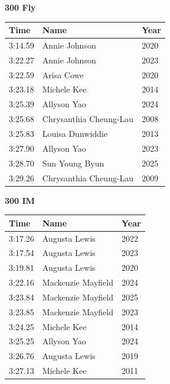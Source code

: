 \vspace{1.2em}
\noindent\begin{minipage}[t]{0.48\textwidth}
\centering
\textbf{\textcolor{teamprimary}{300 Fly}}\par
\vspace{0.5em}
\centering
\small
\renewcommand{\arraystretch}{1.0}
\setlength{\tabcolsep}{4pt}
\begin{tabular}{@{}p{1.8cm}p{3.0cm}p{1.0cm}@{}}
\toprule
\textbf{Time} & \textbf{Name} & \textbf{Year} \\
\midrule
3:14.59 & Annie Johnson & 2020 \\
3:22.27 & Annie Johnson & 2023 \\
3:22.59 & Arisa Cowe & 2020 \\
3:23.18 & Michele Kee & 2014 \\
3:25.39 & Allyson Yao & 2024 \\
3:25.68 & Chrysanthia Cheung-Lau & 2008 \\
3:25.83 & Louisa Dunwiddie & 2013 \\
3:27.90 & Allyson Yao & 2023 \\
3:28.70 & Sun Young Byun & 2025 \\
3:29.26 & Chrysanthia Cheung-Lau & 2009 \\
\bottomrule
\end{tabular}
\end{minipage}
\hfill
\begin{minipage}[t]{0.48\textwidth}
\centering
\textbf{\textcolor{teamprimary}{300 IM}}\par
\vspace{0.5em}
\centering
\small
\renewcommand{\arraystretch}{1.0}
\setlength{\tabcolsep}{4pt}
\begin{tabular}{@{}p{1.8cm}p{3.0cm}p{1.0cm}@{}}
\toprule
\textbf{Time} & \textbf{Name} & \textbf{Year} \\
\midrule
3:17.26 & Augusta Lewis & 2022 \\
3:17.54 & Augusta Lewis & 2023 \\
3:19.81 & Augusta Lewis & 2020 \\
3:22.16 & Mackenzie Mayfield & 2024 \\
3:23.84 & Mackenzie Mayfield & 2025 \\
3:23.85 & Mackenzie Mayfield & 2023 \\
3:24.25 & Michele Kee & 2014 \\
3:25.25 & Allyson Yao & 2024 \\
3:26.76 & Augusta Lewis & 2019 \\
3:27.13 & Michele Kee & 2011 \\
\bottomrule
\end{tabular}
\end{minipage}
